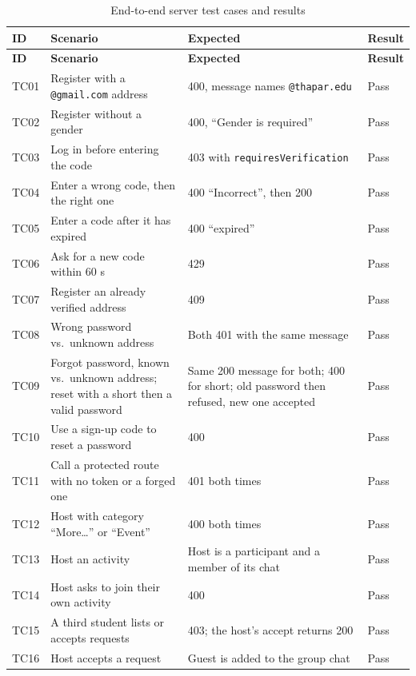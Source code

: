 \begin{longtable}{|p{1.0cm}|L{4.2cm}|L{4.4cm}|p{1.4cm}|}
\caption{End-to-end server test cases and results}\label{tab:apitests}\\
\hline
\textbf{ID} & \textbf{Scenario} & \textbf{Expected} & \textbf{Result} \\
\hline
\endfirsthead
\hline
\textbf{ID} & \textbf{Scenario} & \textbf{Expected} & \textbf{Result} \\
\hline
\endhead
\hline
\endfoot
TC01 & Register with a \texttt{@gmail.com} address & 400, message names \texttt{@thapar.edu} & Pass \\ \hline
TC02 & Register without a gender & 400, ``Gender is required'' & Pass \\ \hline
TC03 & Log in before entering the code & 403 with \texttt{requiresVerification} & Pass \\ \hline
TC04 & Enter a wrong code, then the right one & 400 ``Incorrect'', then 200 & Pass \\ \hline
TC05 & Enter a code after it has expired & 400 ``expired'' & Pass \\ \hline
TC06 & Ask for a new code within 60 s & 429 & Pass \\ \hline
TC07 & Register an already verified address & 409 & Pass \\ \hline
TC08 & Wrong password vs.\ unknown address & Both 401 with the same message & Pass \\ \hline
TC09 & Forgot password, known vs.\ unknown address; reset with a short then a valid password & Same 200 message for both; 400 for short; old password then refused, new one accepted & Pass \\ \hline
TC10 & Use a sign-up code to reset a password & 400 & Pass \\ \hline
TC11 & Call a protected route with no token or a forged one & 401 both times & Pass \\ \hline
TC12 & Host with category ``More\ldots'' or ``Event'' & 400 both times & Pass \\ \hline
TC13 & Host an activity & Host is a participant and a member of its chat & Pass \\ \hline
TC14 & Host asks to join their own activity & 400 & Pass \\ \hline
TC15 & A third student lists or accepts requests & 403; the host's accept returns 200 & Pass \\ \hline
TC16 & Host accepts a request & Guest is added to the group chat & Pass \\ \hline

\end{longtable}
